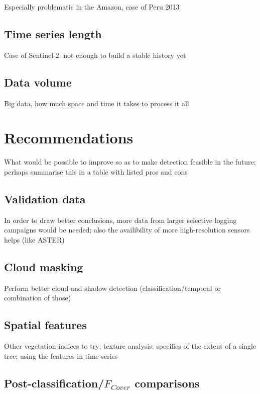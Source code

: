 \documentclass[a4paper,12pt]{scrbook}
\begin{document}
Especially problematic in the Amazon, case of Peru 2013

\subsection{Time series length}

Case of Sentinel-2: not enough to build a stable history yet

\subsection{Data volume}

Big data, how much space and time it takes to process it all

\section{Recommendations}

What would be possible to improve so as to make detection feasible in the future; perhaps summarise this in a table with listed pros and cons

\subsection{Validation data}

In order to draw better conclusions, more data from larger selective logging campaigns would be needed; also the availibility of more high-resolution sensors helps (like ASTER)

\subsection{Cloud masking}

Perform better cloud and shadow detection (classification/temporal or combination of those)

\subsection{Spatial features}

Other vegetation indices to try; texture analysis; specifics of the extent of a single tree; using the features in time series

\subsection{Post-classification/$F_{Cover}$ comparisons}
\end{document}
